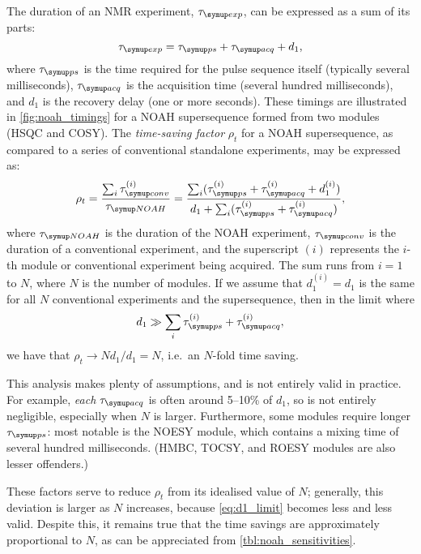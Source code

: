 The duration of an NMR experiment, $\tauexp$, can be expressed as a sum of its parts:
\begin{equation}
    \label{eq:exp_duration_2d}
    \tauexp = \taups + \tauacq + d_1,
\end{equation}
where $\taups$ is the time required for the pulse sequence itself (typically several milliseconds), $\tauacq$ is the acquisition time (several hundred milliseconds), and $d_1$ is the recovery delay (one or more seconds).
These timings are illustrated in \cref{fig:noah_timings} for a NOAH supersequence formed from two modules (HSQC and COSY).
The \textit{time-saving factor} $\rho_t$ for a NOAH supersequence, as compared to a series of conventional standalone experiments, may be expressed as:
\begin{equation}
    \label{eq:rho_t}
    \rho_t
    = \frac{\sum_i \tauconv^{(i)}}{\tauNOAH}
    = \frac{{\sum_i (\taups^{(i)} + \tauacq^{(i)} + d_1^{(i)})}}{d_1 + \sum_i (\taups^{(i)} + \tauacq^{(i)})},
\end{equation}
where $\tauNOAH$ is the duration of the NOAH experiment, $\tauconv$ is the duration of a conventional experiment, and the superscript $(i)$ represents the $i$-th module or conventional experiment being acquired.
The sum runs from $i = 1$ to $N$, where $N$ is the number of modules.
If we assume that $d_1^{(i)} = d_1$ is the same for all $N$ conventional experiments and the supersequence, then in the limit where
\begin{equation}
    \label{eq:d1_limit}
    d_1 \gg \sum_i \taups^{(i)} + \tauacq^{(i)},
\end{equation}
we have that $\rho_t \to Nd_1/d_1 = N$, i.e.\ an $N$-fold time saving.

This analysis makes plenty of assumptions, and is not entirely valid in practice.
For example, \textit{each} $\tauacq$ is often around 5--10\% of $d_1$, so is not entirely negligible, especially when $N$ is larger.
Furthermore, some modules require longer $\taups$: most notable is the NOESY module, which contains a mixing time of several hundred milliseconds. (HMBC, TOCSY, and ROESY modules are also lesser offenders.)

These factors serve to reduce $\rho_t$ from its idealised value of $N$; generally, this deviation is larger as $N$ increases, because \cref{eq:d1_limit} becomes less and less valid.
Despite this, it remains true that the time savings are approximately proportional to $N$, as can be appreciated from \cref{tbl:noah_sensitivities}.

